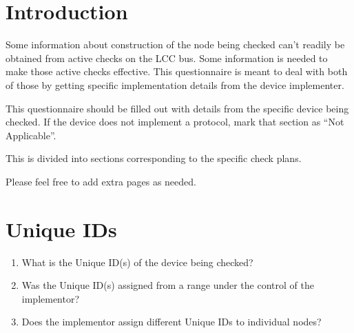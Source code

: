 



\maketitle
\thispagestyle{firststyle}

\section{Introduction}

Some information about construction of the node being checked can't readily be obtained
from active checks on the LCC bus. Some information is needed to make those active 
checks effective.  This questionnaire is meant to deal with both of those
by getting specific implementation details from the device implementer.

This questionnaire should be filled out with details from the specific device being checked.
If the device does not implement a protocol, mark that section as ``Not Applicable''.

This is divided into sections corresponding to the specific check plans.

Please feel free to add extra pages as needed.

\section{Unique IDs}
    \begin{enumerate}
        \item What is the Unique ID(s) of the device being checked?
        \item Was the Unique ID(s) assigned from a range under the control of the implementor? 
        \item Does the implementor assign different Unique IDs to individual nodes?
    \end{enumerate}


